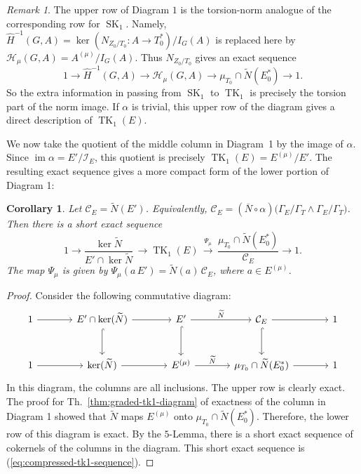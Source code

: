 \documentclass[11pt]{article}
\numberwithin{equation}{section}
\theoremstyle{plain}
\newtheorem{corollary}[theorem]{Corollary}
\theoremstyle{remark}
\newtheorem{remark}[theorem]{Remark}
\newcommand{\Emu}{E^{(\mu)}}
\newcommand{\wt}{\widetilde}
\begin{document}
\begin{remark}
\label{rem:torsion-norm-row}
The upper row of Diagram $1$ is  the torsion-norm analogue of the corresponding
\cite{hazrat-wadsworth-2011} row for $\operatorname{SK}_1$.  Namely, 
$\widehat H^{-1}(G,A) = \ker(N_{Z_0/T_0}:A\to T_0^*)/I_{G}(A)$ is replaced here
by $\mathcal H_\mu(G,A) = A^{(\mu)}/I_{G}(A)$. Thus $N_{Z_0/T_0}$ gives an exact sequence
$$
        1\longrightarrow
        \widehat H^{-1}(G,A)
        \longrightarrow
        \mathcal H_\mu(G,A)
        \longrightarrow
        \mu_{T_0}\cap\widetilde N(E_0^*)
        \longrightarrow 1.
$$
So the extra information in passing from $\operatorname{SK}_1$ to
$\operatorname{TK}_1$ is precisely the torsion part of the norm image.  If
$\alpha$ is trivial, this upper row of the diagram gives a direct description of
$\operatorname{TK}_1(E)$.
\end{remark}

\medskip

We now take the quotient of the middle column in Diagram~1 by the image of
$\alpha$.  Since ${\operatorname{im}\alpha=E'/\mathcal I_E}$, this quotient
is precisely $\operatorname{TK}_1(E)=E^{(\mu)}/E'$.  The resulting exact
sequence gives a more compact form of the lower portion of Diagram 1:

\begin{corollary}
\label{cor:compressed-tk1-sequence}
\textit{Let $\mathcal C_E=\widetilde N(E')$. Equivalently, $\mathcal C_E = (\overline N\circ\alpha)
        \bigl(\Gamma_E/\Gamma_T\wedge\Gamma_E/\Gamma_T\bigr)$. Then there is a short exact sequence}
\begin{equation}
\label{eq:compressed-tk1-sequence}
        1\longrightarrow
        \frac{\ker\widetilde N}{E'\cap\ker\widetilde N}\,
        \longrightarrow
        \operatorname{TK}_1(E)\,
        \overset{\Psi_\mu}{\longrightarrow} \,
        \frac{\mu_{T_0}\cap\widetilde N(E_0^*)}{\mathcal C_E}
        \longrightarrow 1 .
\end{equation}
\textit{The map $\Psi_\mu$ is given by $\Psi_\mu(a\,E')=\widetilde N(a)\,\mathcal C_E$, where $a\in E^{(\mu)}$.}

\end{corollary}
\begin{proof}
Consider the following commutative diagram:
$$
\begin{tikzcd}[column sep=large,row sep=large]
1 \arrow[r]
& E'\cap \ker(\wt N) \arrow[r] \arrow[d,hook]
& E' \arrow[r,"\wt N"] \arrow[d,hook]
& \mathcal C_E \arrow[r] \arrow[d,hook]
& 1 \\
1 \arrow[r]
& \ker(\wt N)\arrow[r]
& \Emu  \arrow[r,"\wt N"]
& \mu_{T_0} \cap \wt N(E_0^*)  \arrow[r]
& 1 
\end{tikzcd}
$$
In this  diagram, the columns are all inclusions.  The upper row is clearly exact. The proof for 
Th.~\ref{thm:graded-tk1-diagram} 
of exactness of the column in Diagram 1 showed that $\wt N$ maps $\Emu$ onto  $\mu_{T_0} \cap \wt N(E_0^*)$.
Therefore, the lower row of this diagram is exact.  By the $5$-Lemma, there is a short exact sequence of 
cokernels of the columns in the diagram.  This short exact sequence is (\ref{eq:compressed-tk1-sequence}).  
\end{proof}
\end{document}

